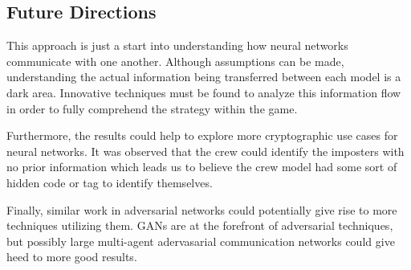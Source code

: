\documentclass[10pt,twocolumn,letterpaper]{article}
\begin{document}
\subsection{Future Directions}
This approach is just a start into understanding how neural networks
communicate with one another. Although assumptions can be made,
understanding the actual information being transferred between each model is
a dark area. Innovative techniques must be found to analyze this information flow 
in order to fully comprehend the strategy within the game.

Furthermore, the results could help to explore more cryptographic use cases for neural networks.
It was observed that the crew could identify the imposters with no prior information which leads us to
believe the crew model had some sort of hidden code or tag to identify themselves.

Finally, similar work in adversarial networks could potentially give rise to
more techniques utilizing them. GANs are at the forefront of adversarial techniques, but possibly
large multi-agent adervasarial communication networks could give heed to more good results.
{\small


}
\end{document}
